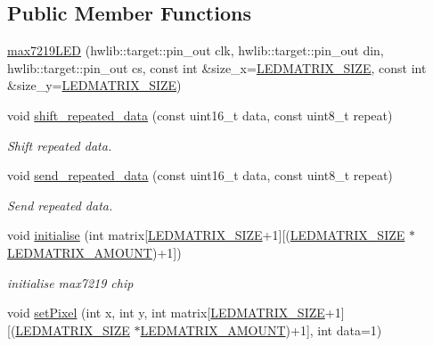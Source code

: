 \subsection*{Public Member Functions}
\begin{DoxyCompactItemize}
\item 
\hyperlink{classmax7219_l_e_d_a3f13dbd1dd54e3d3ce0148c1119273e5}{max7219\+L\+ED} (hwlib\+::target\+::pin\+\_\+out clk, hwlib\+::target\+::pin\+\_\+out din, hwlib\+::target\+::pin\+\_\+out cs, const int \&size\+\_\+x=\hyperlink{max7219_l_e_dconstants_8hpp_a2a4cf20d00f170bb1778318f645ab6cb}{L\+E\+D\+M\+A\+T\+R\+I\+X\+\_\+\+S\+I\+ZE}, const int \&size\+\_\+y=\hyperlink{max7219_l_e_dconstants_8hpp_a2a4cf20d00f170bb1778318f645ab6cb}{L\+E\+D\+M\+A\+T\+R\+I\+X\+\_\+\+S\+I\+ZE})
\item 
void \hyperlink{classmax7219_l_e_d_ae15df95125db9c4efb33f19720c893a0}{shift\+\_\+repeated\+\_\+data} (const uint16\+\_\+t data, const uint8\+\_\+t repeat)
\begin{DoxyCompactList}\small\item\em Shift repeated data. \end{DoxyCompactList}\item 
void \hyperlink{classmax7219_l_e_d_af913d07107bfc902dc66af95ead59f21}{send\+\_\+repeated\+\_\+data} (const uint16\+\_\+t data, const uint8\+\_\+t repeat)
\begin{DoxyCompactList}\small\item\em Send repeated data. \end{DoxyCompactList}\item 
void \hyperlink{classmax7219_l_e_d_abb0f536db36aa950bc189416d65db6a7}{initialise} (int matrix\mbox{[}\hyperlink{max7219_l_e_dconstants_8hpp_a2a4cf20d00f170bb1778318f645ab6cb}{L\+E\+D\+M\+A\+T\+R\+I\+X\+\_\+\+S\+I\+ZE}+1\mbox{]}\mbox{[}(\hyperlink{max7219_l_e_dconstants_8hpp_a2a4cf20d00f170bb1778318f645ab6cb}{L\+E\+D\+M\+A\+T\+R\+I\+X\+\_\+\+S\+I\+ZE} $\ast$\hyperlink{max7219_l_e_dconstants_8hpp_aa3f1c3f51823e34beb0682e7f799793b}{L\+E\+D\+M\+A\+T\+R\+I\+X\+\_\+\+A\+M\+O\+U\+NT})+1\mbox{]})
\begin{DoxyCompactList}\small\item\em initialise max7219 chip \end{DoxyCompactList}\item 
void \hyperlink{classmax7219_l_e_d_a651b73c3236443e478785f4a3e180b3a}{set\+Pixel} (int x, int y, int matrix\mbox{[}\hyperlink{max7219_l_e_dconstants_8hpp_a2a4cf20d00f170bb1778318f645ab6cb}{L\+E\+D\+M\+A\+T\+R\+I\+X\+\_\+\+S\+I\+ZE}+1\mbox{]}\mbox{[}(\hyperlink{max7219_l_e_dconstants_8hpp_a2a4cf20d00f170bb1778318f645ab6cb}{L\+E\+D\+M\+A\+T\+R\+I\+X\+\_\+\+S\+I\+ZE} $\ast$\hyperlink{max7219_l_e_dconstants_8hpp_aa3f1c3f51823e34beb0682e7f799793b}{L\+E\+D\+M\+A\+T\+R\+I\+X\+\_\+\+A\+M\+O\+U\+NT})+1\mbox{]}, int data=1)

\end{DoxyCompactItemize}
